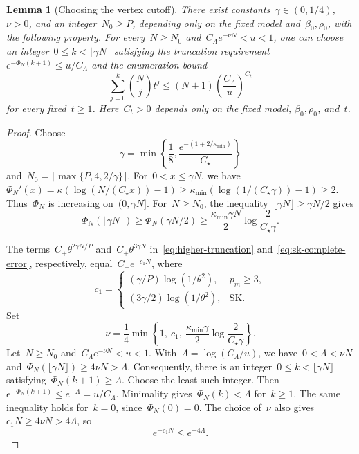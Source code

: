 \documentclass[letterpaper,11pt,reqno]{amsart}
\renewcommand{\leq}{\leqslant}
\renewcommand{\geq}{\geqslant}
\newtheorem{lemma}[theorem]{Lemma}
\begin{document}
\begin{lemma}[Choosing the vertex cutoff]\label{lem:cutoff-selection}
There exist constants~$\gamma\in(0,1/4)$, $\nu>0$, and an integer~$N_0\geq P$, depending only on the fixed model and~$\beta_0,\rho_0$, with the following property. For every~$N\geq N_0$ and~$C_\Lambda e^{-\nu N}<u<1$, one can choose an integer~$0\leq k<\lfloor\gamma N\rfloor$ satisfying the truncation requirement~$e^{-\Phi_N(k+1)}\leq u/C_\Lambda$ and the enumeration bound
\begin{equation}\label{eq:cutoff-cost}
\sum_{j=0}^{k}\binom Nj t^j\leq(N+1)\left(\frac{C_\Lambda}{u}\right)^{C_t}
\end{equation}
for every fixed~$t\geq1$. Here~$C_t>0$ depends only on the fixed model, $\beta_0,\rho_0$, and~$t$.
\end{lemma}
\begin{proof}
Choose
\begin{equation*}
\gamma=\min\left\{\frac18,\frac{e^{-(1+2/\kappa_{\min})}}{C_\star}\right\}
\end{equation*}
and~$N_0=\lceil\max\{P,4,2/\gamma\}\rceil$. For~$0<x\leq\gamma N$, we have~$\Phi_N'(x)=\kappa(\log(N/(C_\star x))-1)\geq\kappa_{\min}(\log(1/(C_\star\gamma))-1)\geq2$. Thus~$\Phi_N$ is increasing on~$(0,\gamma N]$. For~$N\geq N_0$, the inequality~$\lfloor\gamma N\rfloor\geq\gamma N/2$ gives
\begin{equation*}
\Phi_N(\lfloor\gamma N\rfloor)
\geq\Phi_N(\gamma N/2)
\geq\frac{\kappa_{\min}\gamma N}{2}\log\frac{2}{C_\star\gamma}.
\end{equation*}

The terms~$C_+\theta^{2\gamma N/P}$ and~$C_+\theta^{3\gamma N}$ in~\eqref{eq:higher-truncation} and~\eqref{eq:sk-complete-error}, respectively, equal~$C_+e^{-c_1N}$, where
\begin{equation*}
c_1=\begin{cases}
(\gamma/P)\log(1/\theta^2),&p_m\geq3,\\
(3\gamma/2)\log(1/\theta^2),&\text{SK}.
\end{cases}
\end{equation*}
Set
\begin{equation}\label{eq:algorithm-remainder-scale}
\nu=\frac14\min\left\{1,\ c_1,\ \frac{\kappa_{\min}\gamma}{2}\log\frac{2}{C_\star\gamma}\right\}.
\end{equation}
Let~$N\geq N_0$ and~$C_\Lambda e^{-\nu N}<u<1$. With~$\Lambda=\log(C_\Lambda/u)$, we have~$0<\Lambda<\nu N$ and~$\Phi_N(\lfloor\gamma N\rfloor)\geq4\nu N>\Lambda$. Consequently, there is an integer~$0\leq k<\lfloor\gamma N\rfloor$ satisfying~$\Phi_N(k+1)\geq\Lambda$. Choose the least such integer. Then~$e^{-\Phi_N(k+1)}\leq e^{-\Lambda}=u/C_\Lambda$. Minimality gives~$\Phi_N(k)<\Lambda$ for~$k\geq1$. The same inequality holds for~$k=0$, since~$\Phi_N(0)=0$. The choice of~$\nu$ also gives~$c_1N\geq4\nu N>4\Lambda$, so
\begin{equation}\label{eq:cutoff-error}
e^{-c_1N}\leq e^{-4\Lambda}.
\end{equation}


\end{proof}
\end{document}
